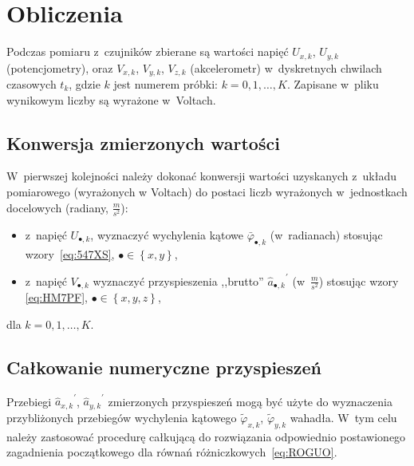 \documentclass[paper=a4,DIV=12]{tmmlab}
\begin{document}
\section{Obliczenia}
\label{sec:ZCIBX}

Podczas pomiaru z~czujników zbierane są wartości napięć $U_{x,k}$, $U_{y,k}$
(potencjometry), oraz $V_{x,k}$, $V_{y,k}$, $V_{z,k}$ (akcelerometr)
w~dyskretnych chwilach czasowych $t_k$, gdzie $k$ jest numerem próbki: $k = 0,
1, \dots, K$. Zapisane w~pliku wynikowym liczby są wyrażone w~Voltach.

\subsection{Konwersja zmierzonych wartości}
\label{sec:O9JWA}

W~pierwszej kolejności należy dokonać konwersji wartości uzyskanych z~układu
pomiarowego (wyrażonych w Voltach) do postaci liczb wyrażonych w~jednostkach
docelowych (radiany, $\tfrac{m}{s^2}$):
\begin{itemize}
  \item z~napięć $U_{\bullet,k}$, wyznaczyć
        wychylenia kątowe $\bar{\varphi}_{\bullet,k}$ (w~radianach) stosując
        wzory~\eqref{eq:547XS}, $\bullet \in \left\{x,y\right\}$,
  \item z~napięć $V_{\bullet,k}$ wyznaczyć przyspieszenia
        ,,brutto'' ${\hat{a}_{\bullet,k}}^{\prime}$ (w~$\tfrac{m}{s^2}$)
        stosując wzory \eqref{eq:HM7PF}, $\bullet \in \left\{x,y,z\right\}$,
\end{itemize}
dla $k=0,1,\dots,K$.

\subsection{Całkowanie numeryczne przyspieszeń}
\label{sec:OKCY5}

Przebiegi ${\hat{a}_{x,k}}^{\prime}$, ${\hat{a}_{y,k}}^{\prime}$ zmierzonych
przyspieszeń mogą być użyte do wyznaczenia przybliżonych przebiegów wychylenia
kątowego $\widetilde{\varphi}_{x,k}$, $\widetilde{\varphi}_{y,k}$ wahadła.
W~tym celu należy zastosować procedurę całkującą do rozwiązania odpowiednio
postawionego zagadnienia początkowego dla równań różniczkowych~\eqref{eq:ROGUO}.
\end{document}
